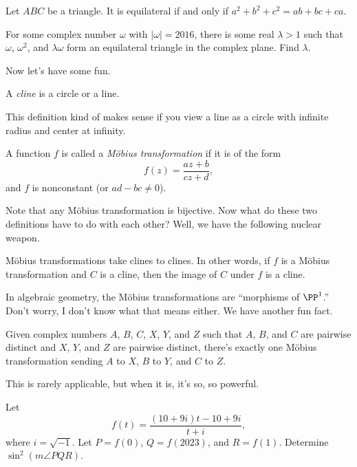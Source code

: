 \documentclass[11pt]{scrartcl}
\begin{document}
\begin{lemma}[EGMO 6.28]
    Let $ABC$ be a triangle. It is equilateral if and only if $a^2 + b^2 + c^2 = ab + bc + ca$.
\end{lemma}

\begin{example}[CMIMC 2016/A6]
    For some complex number $\omega$ with $\lvert \omega\rvert = 2016$, there is some real $\lambda > 1$ such that $\omega$, $\omega^2$, and $\lambda\omega$ form an equilateral triangle in the complex plane. Find $\lambda$.
\end{example}

Now let's have some fun.

\begin{definition}
    A \emph{cline} is a circle or a line.
\end{definition}

This definition kind of makes sense if you view a line as a circle with infinite radius and center at infinity.

\begin{definition}
    A function $f$ is called a \emph{M\"obius transformation} if it is of the form
    \[f(z) = \frac{az + b}{cz + d},\]
    and $f$ is nonconstant (or $ad - bc \neq 0$).
\end{definition}

Note that any M\"obius transformation is bijective. Now what do these two definitions have to do with each other? Well, we have the following nuclear weapon.

\begin{theorem}
    M\"obius transformations take clines to clines. In other words, if $f$ is a M\"obius transformation and $C$ is a cline, then the image of $C$ under $f$ is a cline.
\end{theorem}

In algebraic geometry, the M\"obius transformations are ``morphisms of $\PP^1$.'' Don't worry, I don't know what that means either. We have another fun fact.
\begin{theorem}
    Given complex numbers $A$, $B$, $C$, $X$, $Y$, and $Z$ such that $A$, $B$, and $C$ are pairwise distinct and $X$, $Y$, and $Z$ are pairwise distinct, there's exactly one M\"obius transformation sending $A$ to $X$, $B$ to $Y$, and $C$ to $Z$.
\end{theorem}

This is rarely applicable, but when it is, it's so, so powerful.

\begin{example}[Prize 2023/13]
    Let
    \[f(t) = \frac{(10 + 9i)t - 10 + 9i}{t + i},\]
    where $i=\sqrt{-1}$. Let $P = f(0)$, $Q = f(2023)$, and $R = f(1)$. Determine $\sin^2(m\angle PQR)$.
\end{example}
\end{document}
